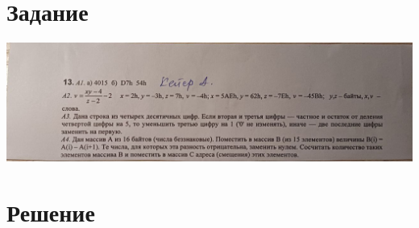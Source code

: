 \documentclass[12pt]{article}
\begin{document}
	
	\section*{Задание}
	
	\includegraphics[width=400pt]{variant_13.jpg}
	
	\newpage
	
	
	\section*{Решение}
	
\end{document}
